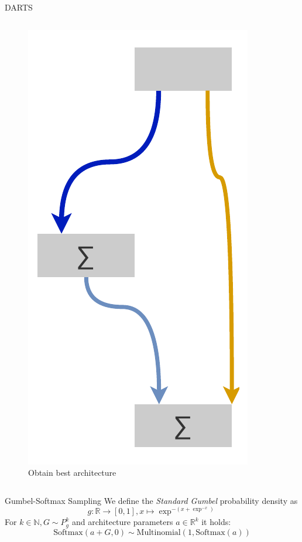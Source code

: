 \documentclass[]{beamer}
\begin{document}
\begin{frame}{DARTS}
\begin{columns}
\begin{column}{.35\textwidth}
\begin{figure}
	\includegraphics[scale=0.4, center]{graphics/darts_3.pdf}
	\caption{Obtain best architecture}
\end{figure}
\end{column}
\end{columns}
\end{frame}

\begin{frame}{Gumbel-Softmax Sampling}
\vspace{10pt}
We define the \textit{Standard Gumbel} probability density as
\begin{equation*}
g:\mathbb{R}\rightarrow [0,1],x\mapsto \exp^{-(x+\exp^{-x})}
\end{equation*}
For $k\in\mathbb{N}, G\sim P^k_g$ and architecture parameters $a\in\mathbb{R}^k$ it holds:
\begin{equation*}
\text{Softmax}(a + G, 0)\sim \text{Multinomial}(1, \text{Softmax}(a))
\end{equation*}
\end{frame}
\end{document}
